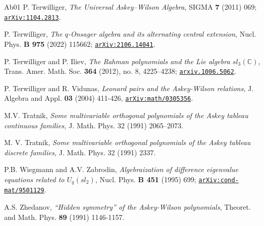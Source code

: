 \documentclass[11pt]{amsart}
\numberwithin{equation}{section}
\numberwithin{equation}{section}
\begin{document}
\begin{thebibliography}{Ab01}
P. Terwilliger, {\it The Universal Askey–Wilson Algebra}, SIGMA {\bf 7} (2011) 069; 
\href{https://arxiv.org/abs/1104.2813}
{\tt arXiv:1104.2813}.


P. Terwilliger, {\it The $q$-Onsager algebra and its alternating central extension}, Nucl. Phys. 
{\bf B 975} (2022) 115662; 
\href{https://arxiv.org/abs/2106.14041}{\tt arXiv:2106.14041}.

P. Terwilliger and P. Iliev, {\it The Rahman polynomials and the Lie algebra $sl_3(\mathbb C)$}, Trans. Amer. Math. Soc. {\bf 364} (2012), no. 8, 4225--4238;
 \href{https://arxiv.org/abs/1006.5062}{\tt arxiv.1006.5062}.


P. Terwilliger and R. Vidunas, {\it Leonard pairs and the Askey-Wilson relations},  J. Algebra and Appl. {\bf 03} (2004) 411-426,  \href{https://arxiv.org/abs/math/0305356}{\tt arXiv:math/0305356}.

 M.V. Tratnik, 
 {\it Some multivariable orthogonal polynomials of the Askey tableau continuous families,} 
 J. Math. Phys. 32 (1991) 2065–2073.

M. V. Tratnik,
\textit{
Some multivariable orthogonal polynomials of the Askey tableau discrete
families,}
J. Math. Phys. 32 (1991) 2337.


P.B. Wiegmann and A.V. Zabrodin, {\it Algebraization of difference eigenvalue equations related to $U_q(sl_2)$}, Nucl. Phys. {\bf B 451} (1995) 699; \href{https://arxiv.org/abs/cond-mat/9501129}
{\texttt{arXiv:cond-mat/9501129}}.

A.S. Zhedanov, {\it ``Hidden symmetry'' of the Askey-Wilson polynomials}, Theoret. and Math. Phys. {\bf 89} (1991) 1146-1157.



\end{thebibliography}
\end{document}
